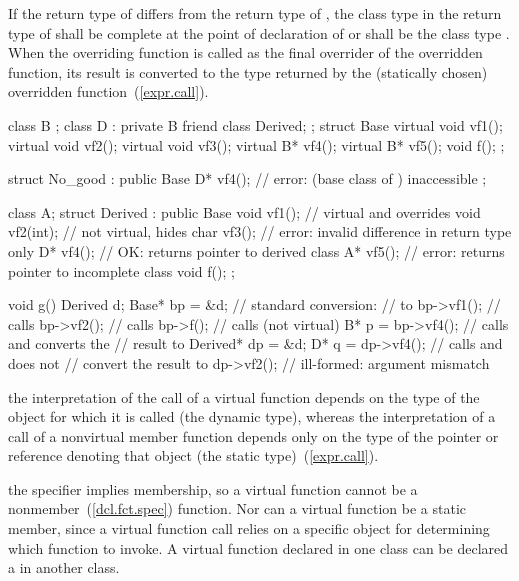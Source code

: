 If the return type of  differs from the return type of
, the class type in the return type of  shall be
complete at the point of declaration of  or shall be the
class type . When the overriding function is called as the
final overrider of the overridden function, its result is converted to
the type returned by the (statically chosen) overridden
function~(\ref{expr.call}).
\enterexample
{}%
\begin{codeblock}
class B {};
class D : private B { friend class Derived; };
struct Base {
    virtual void vf1();
    virtual void vf2();
    virtual void vf3();
    virtual B*   vf4();
    virtual B*   vf5();
    void f();
};

struct No_good : public Base {
    D*  vf4();			// error:  (base class of ) inaccessible
};

class A;
struct Derived : public Base {
    void vf1();			// virtual and overrides 
    void vf2(int);		// not virtual, hides 
    char vf3();			// error: invalid difference in return type only
    D*  vf4();			// OK: returns pointer to derived class
    A*  vf5();			// error: returns pointer to incomplete class
    void f();
};

void g()
{
    Derived d;
    Base* bp = &d;              // standard conversion:
                                //  to 
    bp->vf1();                  // calls 
    bp->vf2();                  // calls 
    bp->f();                    // calls  (not virtual)
    B*  p = bp->vf4();          // calls  and converts the
                                // result to 
    Derived*  dp = &d;
    D*  q = dp->vf4();          // calls  and does not
                                // convert the result to 
    dp->vf2();                  // ill-formed: argument mismatch
}
\end{codeblock}
\exitexampleb

\pnum
\enternote
the interpretation of the call of a virtual function depends on the type
of the object for which it is called (the dynamic type), whereas the
interpretation of a call of a nonvirtual member function depends only
on the type of the pointer or reference denoting that object (the static
type)~(\ref{expr.call}).
\exitnote

\pnum
\enternote
the  specifier implies membership, so a virtual function
cannot be a nonmember~(\ref{dcl.fct.spec}) function. Nor can a virtual
function be a static member, since a virtual function call relies on a
specific object for determining which function to invoke. A virtual
function declared in one class can be declared a  in
another class.
\exitnote

